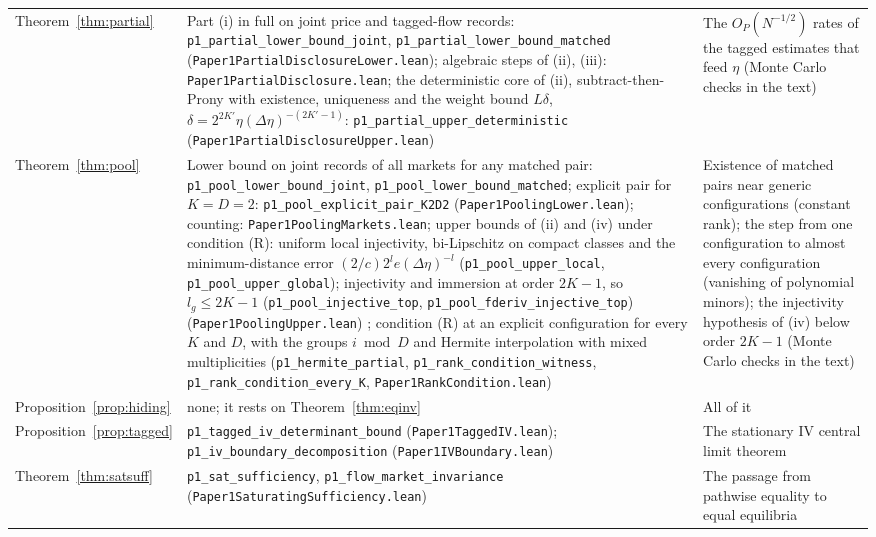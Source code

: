 \begin{longtable}{>{\raggedright\arraybackslash}p{}>{\raggedright\arraybackslash}p{}>{\raggedright\arraybackslash}p{}}
Theorem~\ref{thm:partial} & Part (i) in full on joint price and tagged-flow records: \texttt{p1\_partial\_lower\_bound\_joint}, \texttt{p1\_partial\_lower\_bound\_matched} (\nolinkurl{Paper1PartialDisclosureLower.lean}); algebraic steps of (ii), (iii): \nolinkurl{Paper1PartialDisclosure.lean}; the deterministic core of (ii), subtract-then-Prony with existence, uniqueness and the weight bound $L\delta$, $\delta=2^{2K'}\eta(\Delta\eta)^{-(2K'-1)}$: \texttt{p1\_partial\_upper\_deterministic} (\nolinkurl{Paper1PartialDisclosureUpper.lean}) & The $O_P(N^{-1/2})$ rates of the tagged estimates that feed $\eta$ (Monte Carlo checks in the text)\\
Theorem~\ref{thm:pool} & Lower bound on joint records of all markets for any matched pair: \texttt{p1\_pool\_lower\_bound\_joint}, \texttt{p1\_pool\_lower\_bound\_matched}; explicit pair for $K=D=2$: \texttt{p1\_pool\_explicit\_pair\_K2D2} (\nolinkurl{Paper1PoolingLower.lean}); counting: \nolinkurl{Paper1PoolingMarkets.lean}; upper bounds of (ii) and (iv) under condition (R): uniform local injectivity, bi-Lipschitz on compact classes and the minimum-distance error $(2/c)2^l e(\Delta\eta)^{-l}$ (\texttt{p1\_pool\_upper\_local}, \texttt{p1\_pool\_upper\_global}); injectivity and immersion at order $2K-1$, so $l_g\le2K-1$ (\texttt{p1\_pool\_injective\_top}, \texttt{p1\_pool\_fderiv\_injective\_top}) (\nolinkurl{Paper1PoolingUpper.lean}) ; condition (R) at an explicit configuration for every $K$ and $D$, with the groups $i\bmod D$ and Hermite interpolation with mixed multiplicities (\texttt{p1\_hermite\_partial}, \texttt{p1\_rank\_condition\_witness}, \texttt{p1\_rank\_condition\_every\_K}, \nolinkurl{Paper1RankCondition.lean}) & Existence of matched pairs near generic configurations (constant rank); the step from one configuration to almost every configuration (vanishing of polynomial minors); the injectivity hypothesis of (iv) below order $2K-1$ (Monte Carlo checks in the text)\\
Proposition~\ref{prop:hiding} & none; it rests on Theorem~\ref{thm:eqinv} & All of it\\
Proposition~\ref{prop:tagged} & \texttt{p1\_tagged\_iv\_determinant\_bound} (\nolinkurl{Paper1TaggedIV.lean}); \texttt{p1\_iv\_boundary\_decomposition} (\nolinkurl{Paper1IVBoundary.lean}) & The stationary IV central limit theorem\\
Theorem~\ref{thm:satsuff} & \texttt{p1\_sat\_sufficiency}, \texttt{p1\_flow\_market\_invariance} (\nolinkurl{Paper1SaturatingSufficiency.lean}) & The passage from pathwise equality to equal equilibria\\

\end{longtable}
